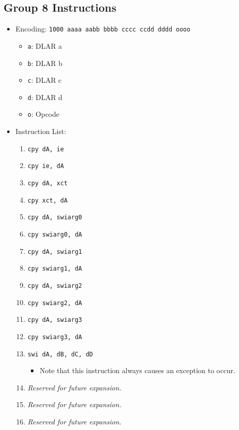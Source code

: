 \documentclass{article}
\begin{document}
	\subsection{Group 8 Instructions}
		\begin{itemize}
		\item Encoding: \texttt{1000 aaaa aabb bbbb  cccc ccdd dddd oooo}
			\begin{itemize}
			\item \texttt{a}: DLAR a
			\item \texttt{b}: DLAR b
			\item \texttt{c}: DLAR c
			\item \texttt{d}: DLAR d
			\item \texttt{o}: Opcode
			\end{itemize}

		\item Instruction List:
			\begin{enumerate}
			\item \texttt{cpy dA, ie}
			\item \texttt{cpy ie, dA}
			\item \texttt{cpy dA, xct}
			\item \texttt{cpy xct, dA}

			\item \texttt{cpy dA, swiarg0}
			\item \texttt{cpy swiarg0, dA}
			\item \texttt{cpy dA, swiarg1}
			\item \texttt{cpy swiarg1, dA}

			\item \texttt{cpy dA, swiarg2}
			\item \texttt{cpy swiarg2, dA}
			\item \texttt{cpy dA, swiarg3}
			\item \texttt{cpy swiarg3, dA}

			\item \texttt{swi dA, dB, dC, dD}
				\begin{itemize}
				\item Note that this instruction always causes an exception
					to occur.
				\end{itemize}
			\item \textit{Reserved for future expansion.}
			\item \textit{Reserved for future expansion.}
			\item \textit{Reserved for future expansion.}
			\end{enumerate}
		\end{itemize}
		\newpage
\end{document}
